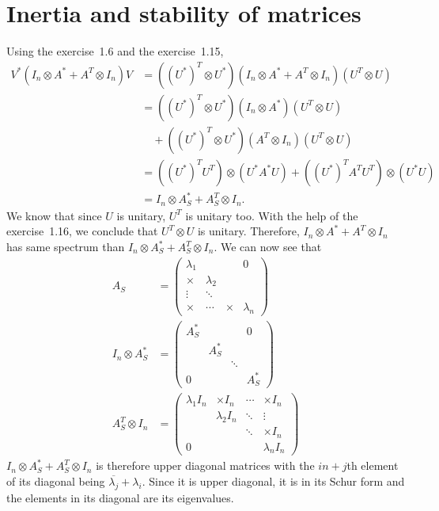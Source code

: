 \section{Inertia and stability of matrices}
\begin{solution}
  Using the exercise~1.6 and the exercise~1.15,
  \begin{align*}
    V^* (I_n \otimes A^* + A^T \otimes I_n) V
    & = ((U^*)^T \otimes U^*) (I_n \otimes A^* + A^T \otimes I_n) (U^T \otimes U)\\
    & = ((U^*)^T \otimes U^*) (I_n \otimes A^*) (U^T \otimes U)\\
    & \quad + ((U^*)^T \otimes U^*) (A^T \otimes I_n) (U^T \otimes U)\\
    & = ((U^*)^TU^T) \otimes (U^*A^*U) + ((U^*)^TA^TU^T) \otimes (U^*U)\\
    & = I_n \otimes A_S^* + A_S^T \otimes I_n.
  \end{align*}
  We know that since $U$ is unitary, $U^T$ is unitary too.
  With the help of the exercise~1.16, we conclude that $U^T \otimes U$ is unitary.
  Therefore,
  $I_n \otimes A^* + A^T \otimes I_n$ has same spectrum than
  $I_n \otimes A_S^* + A_S^T \otimes I_n$.
  We can now see that
  \begin{align*}
    A_S & =
    \begin{pmatrix}
      \lambda_1 &           &        & 0\\
      \times    & \lambda_2 &        & \\
      \vdots    & \ddots    &        & \\
      \times    & \cdots    & \times & \lambda_n
    \end{pmatrix}\\
    I_n \otimes A_S^* & =
    \begin{pmatrix}
      A_S^* &       &        & 0\\
            & A_S^* &        & \\
            &       & \ddots & \\
      0     &       &        & A_S^*
    \end{pmatrix}\\
    A_S^T \otimes I_n & =
    \begin{pmatrix}
      \lambda_1 I_n & \times I_n    & \cdots & \times I_n\\
                    & \lambda_2 I_n & \ddots & \vdots\\
                    &               & \ddots & \times I_n\\
      0             &               &        & \lambda_n I_n
    \end{pmatrix}
  \end{align*}
  $I_n \otimes A_S^* + A_S^T \otimes I_n$ is therefore
  upper diagonal matrices with the $in + j$th element of its
  diagonal being $\overline{\lambda_j} + \lambda_i$.
  Since it is upper diagonal, it is in its Schur form
  and the elements in its diagonal are its eigenvalues.
\end{solution}

